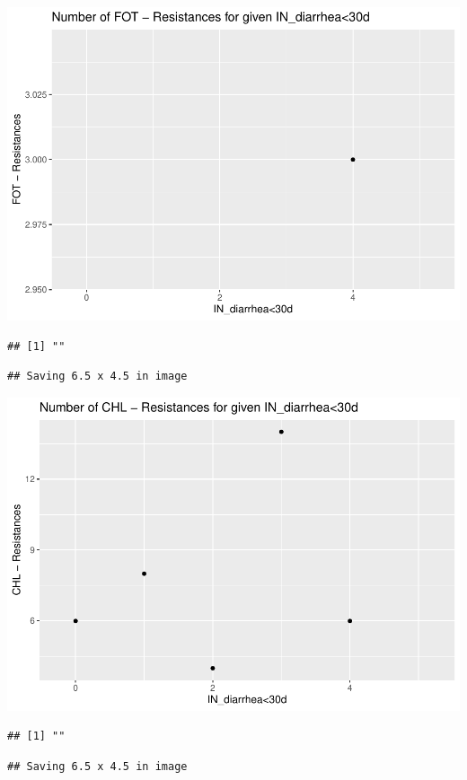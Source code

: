 \documentclass[
]{article}
\begin{document}
\includegraphics{NResistenzen_files/figure-latex/numerical_variables-35.pdf}

\begin{verbatim}
## [1] ""
\end{verbatim}

\begin{verbatim}
## Saving 6.5 x 4.5 in image
\end{verbatim}

\includegraphics{NResistenzen_files/figure-latex/numerical_variables-36.pdf}

\begin{verbatim}
## [1] ""
\end{verbatim}

\begin{verbatim}
## Saving 6.5 x 4.5 in image
\end{verbatim}
\end{document}
